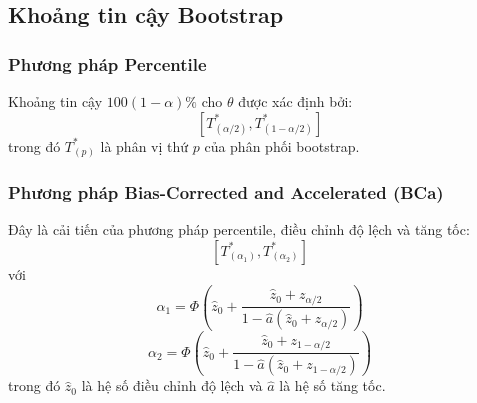 \subsection{Khoảng tin cậy Bootstrap}
\subsubsection*{Phương pháp Percentile}
Khoảng tin cậy $100(1-\alpha)\%$ cho $\theta$ được xác định bởi:
\[
\left[T^*_{(\alpha/2)}, T^*_{(1-\alpha/2)}\right]
\]
trong đó $T^*_{(p)}$ là phân vị thứ $p$ của phân phối bootstrap.

\subsubsection*{Phương pháp Bias-Corrected and Accelerated (BCa)}
Đây là cải tiến của phương pháp percentile, điều chỉnh độ lệch và tăng tốc:
\[
\left[T^*_{(\alpha_1)}, T^*_{(\alpha_2)}\right]
\]
với
\[
\alpha_1 = \Phi\left(\hat{z}_0 + \frac{\hat{z}_0 + z_{\alpha/2}}{1 - \hat{a}(\hat{z}_0 + z_{\alpha/2})}\right)
\]
\[
\alpha_2 = \Phi\left(\hat{z}_0 + \frac{\hat{z}_0 + z_{1-\alpha/2}}{1 - \hat{a}(\hat{z}_0 + z_{1-\alpha/2})}\right)
\]
trong đó $\hat{z}_0$ là hệ số điều chỉnh độ lệch và $\hat{a}$ là hệ số tăng tốc.
